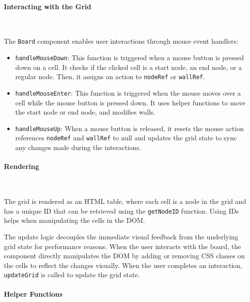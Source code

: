 \paragraph{Interacting with the Grid} \

The \texttt{Board} component enables user interactions through mouse event handlers:

\begin{itemize}
    \item \texttt{handleMouseDown}: This function is triggered when a mouse button is pressed down on a cell. It checks if the clicked cell is a start node, an end node, or a regular node. Then, it assigns an action to \texttt{nodeRef} or \texttt{wallRef}.
    \item \texttt{handleMouseEnter}: This function is triggered when the mouse moves over a cell while the mouse button is pressed down. It uses helper functions to move the start node or end node, and modifies walls.
    \item \texttt{handleMouseUp}: When a mouse button is released, it resets the mouse action references \texttt{nodeRef} and \texttt{wallRef} to null and updates the grid state to sync any changes made during the interactions.
\end{itemize}

\paragraph{Rendering} \

The grid is rendered as an HTML table, where each cell is a node in the grid and has a unique ID that can be retrieved using the \texttt{getNodeID} function. Using IDs helps when manipulating the cells in the DOM.

The update logic decouples the immediate visual feedback from the underlying grid state for performance reasons. When the user interacts with the board, the component directly manipulates the DOM by adding or removing CSS classes on the cells to reflect the changes visually. When the user completes an interaction, \texttt{updateGrid} is called to update the grid state.

\paragraph{Helper Functions} \

